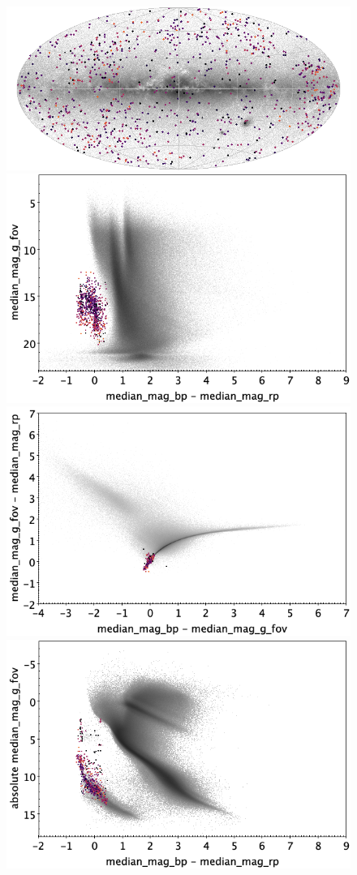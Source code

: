 \documentclass[longauth]{aa}
\begin{document}
\begin{appendix}
\begin{figure}
\centering
{}
\includegraphics[width=0.6\hsize]{figures/appendix/WD_cls_sky.png} 
 \\ %
\vspace{4mm}
 \includegraphics[width=0.45\hsize]{figures/appendix/WD_cls_cm.png}  %
\hspace{2mm}
 \includegraphics[width=0.45\hsize]{figures/appendix/WD_cls_cc.png} \\ %
\vspace{4mm}
 \includegraphics[width=0.45\hsize]{figures/appendix/WD_cls_cam.png}  %

\end{figure}
\end{appendix}
\end{document}
